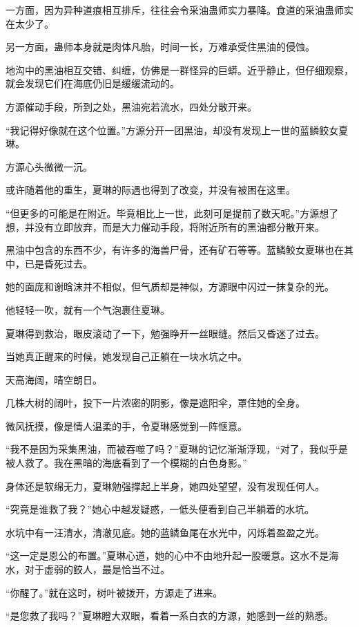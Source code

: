 \begin{this_body}
一方面，因为异种道痕相互排斥，往往会令采油蛊师实力暴降。食道的采油蛊师实在太少了。

另一方面，蛊师本身就是肉体凡胎，时间一长，万难承受住黑油的侵蚀。

地沟中的黑油相互交错、纠缠，仿佛是一群怪异的巨蟒。近乎静止，但仔细观察，就会发现它们在海底仍旧是缓缓流动的。

方源催动手段，所到之处，黑油宛若流水，四处分散开来。

“我记得好像就在这个位置。”方源分开一团黑油，却没有发现上一世的蓝鳞鲛女夏琳。

方源心头微微一沉。

或许随着他的重生，夏琳的际遇也得到了改变，并没有被困在这里。

“但更多的可能是在附近。毕竟相比上一世，此刻可是提前了数天呢。”方源想了想，并没有立即放弃，而是大力催动手段，将附近所有的黑油都分散开来。

黑油中包含的东西不少，有许多的海兽尸骨，还有矿石等等。蓝鳞鲛女夏琳也在其中，已是昏死过去。

她的面庞和谢晗沫并不相似，但气质却是神似，方源眼中闪过一抹复杂的光。

他轻轻一吹，就有一个气泡裹住夏琳。

夏琳得到救治，眼皮滚动了一下，勉强睁开一丝眼缝。然后又昏迷了过去。

当她真正醒来的时候，她发现自己正躺在一块水坑之中。

天高海阔，晴空朗日。

几株大树的阔叶，投下一片浓密的阴影，像是遮阳伞，罩住她的全身。

微风抚摸，像是情人温柔的手，令夏琳感觉到一阵惬意。

“我不是因为采集黑油，而被吞噬了吗？”夏琳的记忆渐渐浮现，“对了，我似乎是被人救了。我在黑暗的海底看到了一个模糊的白色身影。”

身体还是软绵无力，夏琳勉强撑起上半身，她四处望望，没有发现任何人。

“究竟是谁救了我？”她心中越发疑惑，一低头便看到自己半躺着的水坑。

水坑中有一汪清水，清澈见底。她的蓝鳞鱼尾在水光中，闪烁着盈盈之光。

“这一定是恩公的布置。”夏琳心道，她的心中不由地升起一股暖意。这水不是海水，对于虚弱的鲛人，最是恰当不过。

“你醒了。”就在这时，树叶被拨开，方源走了进来。

“是您救了我吗？”夏琳瞪大双眼，看着一系白衣的方源，她感到一丝的熟悉。


\end{this_body}
